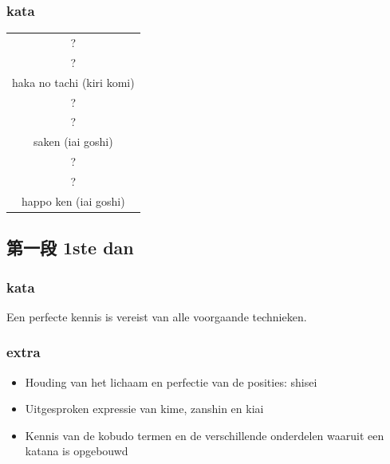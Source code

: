 \documentclass[12pt]{scrartcl}
\begin{document}
\begin{CJK*}{UTF8}{min}
\subsubsection{kata}
\begin{table}[H]
\begin{center}
\begin{tabular}{c}
?\\
?\\
haka no tachi (kiri komi)\\
\hline
?\\
?\\
saken (iai goshi)\\
\hline
?\\
?\\
happo ken (iai goshi)
\end{tabular}
\end{center}
\label{kyuu_1_katori_kata}
\end{table}

\subsection{第一段 1ste dan}
\subsubsection{kata}
\noindent Een perfecte kennis is vereist van alle voorgaande technieken.\\

\subsubsection{extra}
\begin{itemize}
\item Houding van het lichaam en perfectie van de posities: shisei
\item Uitgesproken expressie van kime, zanshin en kiai
\item Kennis van de kobudo termen en de verschillende onderdelen waaruit een katana is opgebouwd
\end{itemize}

\end{CJK*}
\end{document}
